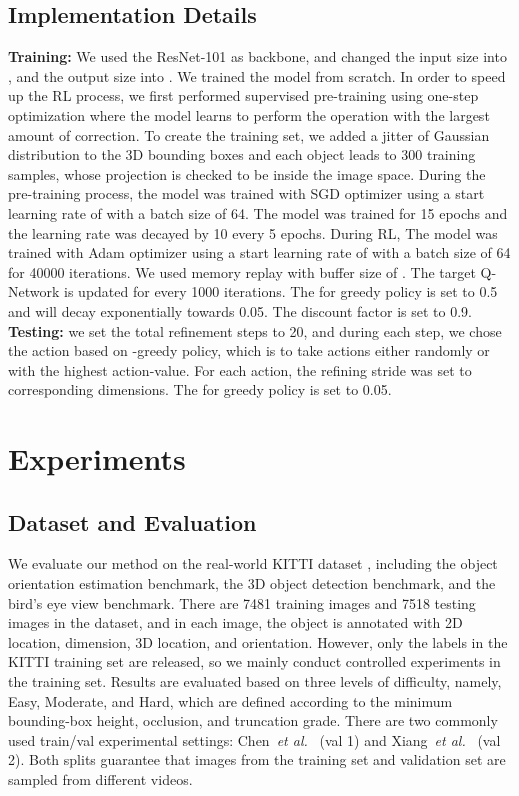 \documentclass[runningheads]{llncs}
\begin{document}
\subsection{Implementation Details}
\textbf{Training:} We used the ResNet-101 as backbone, and changed the input size into , and the output size into . We trained the model from scratch. In order to speed up the RL process, we first performed supervised pre-training using one-step optimization where the model learns to perform the operation with the largest amount of correction. To create the training set, we added a jitter of Gaussian distribution to the 3D bounding boxes and each object leads to 300 training samples, whose projection is checked to be inside the image space. During the pre-training process, the model was trained with SGD optimizer using a start learning rate of  with a batch size of 64. The model was trained for 15 epochs and the learning rate was decayed by 10 every 5 epochs. During RL, The model was trained with Adam optimizer using a start learning rate of  with a batch size of 64 for 40000 iterations. We used memory replay \cite{schaul2015prioritized} with buffer size of . The target Q-Network is updated for every 1000 iterations. The  for greedy policy is set to 0.5 and will decay exponentially towards 0.05. The discount factor  is set to 0.9.
\noindent
\textbf{Testing:} we set the total refinement steps to 20, and during each step, we chose the action based on  -greedy policy, which is  to take actions either randomly or with the highest action-value. For each action, the refining stride was set to  corresponding dimensions. The  for greedy policy is set to 0.05.


\section{Experiments}
\subsection{Dataset and Evaluation}
We evaluate our method on the real-world KITTI dataset \cite{geiger2012we}, including the object orientation estimation benchmark, the 3D object detection benchmark, and the bird's eye view benchmark. There are 7481 training images and 7518 testing images in the dataset, and in each image, the object is annotated with 2D location, dimension, 3D location, and orientation. However, only the labels in the KITTI training set are released, so we mainly conduct controlled experiments in the training set. Results are evaluated based on three levels of difficulty, namely, Easy, Moderate, and Hard, which are defined according to the minimum bounding-box height, occlusion, and truncation grade. There are two commonly used train/val experimental settings: Chen~\emph{et al.}~\cite{chen20153d,chen2016monocular} (val 1) and Xiang~\emph{et al.}~\cite{xiang2015data,xiang2017subcategory} (val 2). Both splits guarantee that images from the training set and validation set are sampled from different videos. 
\end{document}

